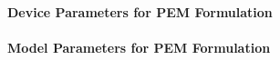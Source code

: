 


\paragraph{Device Parameters for PEM Formulation}


\paragraph{Model Parameters for PEM Formulation}




